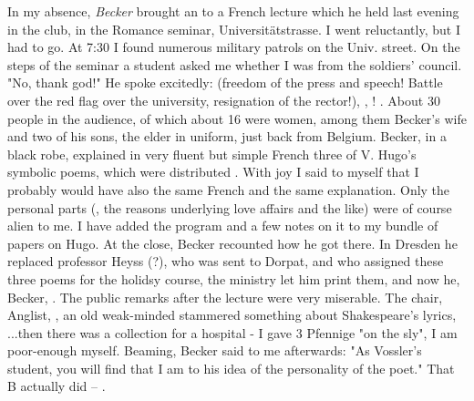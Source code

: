 
In my absence, \textit{Becker} brought an  to a French lecture which he held last evening in the  club, in the Romance seminar, Universitätstrasse. I went reluctantly, but I had to go. At 7:30 I found numerous military patrols on the Univ. street. On the steps of the seminar a student asked me whether I was from the soldiers' council. "No, thank god!" He spoke excitedly:  (freedom of the press and speech! Battle over the red flag over the university, resignation of the rector!), , ! . About 30 people in the audience, of which about 16 were women, among them Becker's wife and two of his sons, the elder in uniform, just back from Belgium. Becker, in a black robe, explained in very fluent but simple French three of V. Hugo's symbolic poems, which were distributed . With joy I said to myself that I probably would have also  the same French and the same explanation. Only the personal parts (, the reasons underlying love affairs and the like) were of course alien to me. I have added the program and a few notes on it to my bundle of papers on Hugo. At the close, Becker recounted how he got there. In Dresden he replaced professor Heyss (?), who was sent to Dorpat, and who assigned these three poems for the holidsy course, the ministry let him print them, and now he, Becker, . The public remarks after the lecture were very miserable. The chair, Anglist, , an old weak-minded  stammered something about Shakespeare's lyrics, ...then there was a collection for a hospital - I gave 3 Pfennige "on the sly", I am poor-enough myself. Beaming, Becker said to me afterwards: "As Vossler's student, you will find that I am  to his idea of the personality of the poet." That B actually did -- .

